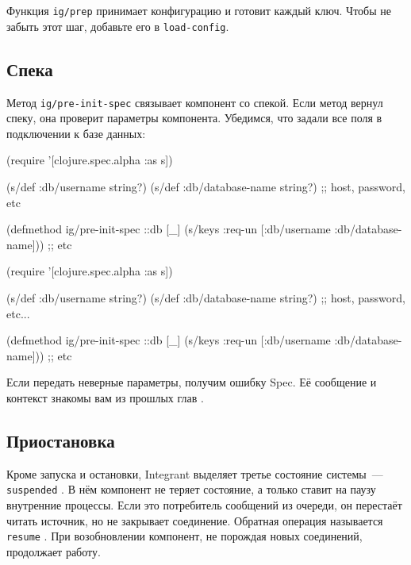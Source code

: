 \fi

Функция \verb|ig/prep| принимает конфигурацию и готовит каждый ключ. Чтобы не
забыть этот шаг, добавьте его в \verb|load-config|.

\subsection{Спека}


Метод \verb|ig/pre-init-spec| связывает компонент со спекой. Если метод вернул
спеку, она проверит параметры компонента. Убедимся, что задали все поля в
подключении к базе данных:

\ifnarrow

\begin{english}
  \begin{clojure}
(require '[clojure.spec.alpha :as s])

(s/def :db/username string?)
(s/def :db/database-name string?)
;; host, password, etc

(defmethod ig/pre-init-spec ::db [_]
  (s/keys :req-un [:db/username
                   :db/database-name]))
                   ;; etc
  \end{clojure}
\end{english}

\else

\begin{english}
  \begin{clojure}
(require '[clojure.spec.alpha :as s])

(s/def :db/username string?)
(s/def :db/database-name string?)
;; host, password, etc...

(defmethod ig/pre-init-spec ::db [_]
  (s/keys :req-un [:db/username
                   :db/database-name])) ;; etc
  \end{clojure}
\end{english}

\fi

Если передать неверные параметры, получим ошибку Spec. Её сообщение и контекст
знакомы вам из прошлых глав .

\subsection{Приостановка}


Кроме запуска и остановки, Integrant выделяет третье состояние системы~---
\verb|suspended| . В нём компонент не теряет состояние, а
только ставит на паузу внутренние процессы. Если это потребитель сообщений из
очереди, он перестаёт читать источник, но не закрывает соединение. Обратная
операция называется \verb|resume| . При возобновлении
компонент, не порождая новых соединений, продолжает работу.

